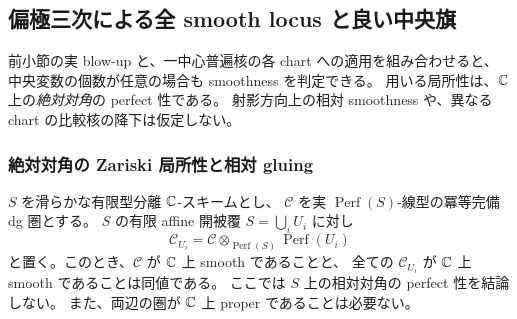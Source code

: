 \subsection{偏極三次による全 smooth locus と良い中央旗}
\label{mcb:subsec:central-bertini}

前小節の実 blow-up と、一中心普遍核の各 chart への適用を組み合わせると、
中央変数の個数が任意の場合も smoothness を判定できる。
用いる局所性は、$\mathbb C$ 上の\emph{絶対対角}の perfect 性である。
射影方向上の相対 smoothness や、異なる chart の比較核の降下は仮定しない。

\subsubsection{絶対対角の Zariski 局所性と相対 gluing}

\begin{lemma}
\label{mcb:lem:smooth-local}
$S$ を滑らかな有限型分離 $\mathbb C$-スキームとし、
$\mathcal C$ を実 $\operatorname{Perf}(S)$-線型の冪等完備 dg 圏とする。
$S$ の有限 affine 開被覆 $S=\bigcup_i U_i$ に対し
\[
 \mathcal C_{U_i}
   =\mathcal C\otimes_{\operatorname{Perf}(S)}\operatorname{Perf}(U_i)
\]
と置く。このとき、$\mathcal C$ が $\mathbb C$ 上 smooth であることと、
全ての $\mathcal C_{U_i}$ が $\mathbb C$ 上 smooth であることは同値である。
ここでは $S$ 上の相対対角の perfect 性を結論しない。
また、両辺の圏が $\mathbb C$ 上 proper であることは必要ない。
\end{lemma}

